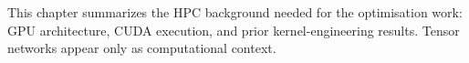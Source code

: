 This chapter summarizes the HPC background needed for the optimisation work:
GPU architecture, CUDA execution, and prior kernel-engineering results.
Tensor networks appear only as computational context.






